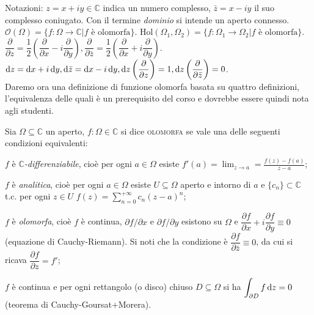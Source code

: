 Notazioni: $z=x+iy \in \mathbb{C}$ indica un numero complesso, $\bar{z}=x-iy$ il suo complesso coniugato. Con il termine \textit{dominio} si intende un aperto connesso. $\mathcal{O}(\Omega)=\{f: \Omega \longrightarrow \mathbb{C} | f \text{ è olomorfa} \}$.
$\text{Hol}(\Omega_1, \Omega_2)=\{f: \Omega_1 \longrightarrow \Omega_2 | f \text{ è olomorfa} \}$.
$\dfrac{\partial}{\partial z}=\dfrac{1}{2}\left(\dfrac{\partial}{\partial x}-i\dfrac{\partial}{\partial y}\right), \dfrac{\partial}{\partial \bar{z}}=\dfrac{1}{2}\left(\dfrac{\partial}{\partial x}+i\dfrac{\partial}{\partial y}\right)$. \\
$\diff z=\diff x+i\diff y, \diff\bar{z}=\diff x-i\diff y, \diff z\left(\dfrac{\partial}{\partial z}\right)=1, \diff z\left(\dfrac{\partial}{\partial \bar{z}}\right)=0$. \\

Daremo ora una definizione di funzione olomorfa basata su quattro definizioni, l'equivalenza delle quali è un prerequisito del corso e dovrebbe essere quindi nota agli studenti.

\begin{defn}
  Sia $\Omega \subseteq \mathbb{C}$ un aperto, $f: \Omega \in \mathbb{C}$ si dice \textsc{olomorfa} se vale una delle seguenti condizioni equivalenti:
  \begin{nlist}
      \item $f$ è \textit{$\mathbb{C}$-differenziabile}, cioè per ogni $a \in \Omega$ esiste $\displaystyle f'(a)=\lim_{z \longrightarrow a}=\frac{f(z)-f(a)}{z-a}$;
      \item $f$ è \textit{analitica}, cioè per ogni $a \in \Omega$ esiste $U \subseteq \Omega$ aperto e intorno di $a$ e $\{c_n\}\subset \mathbb{C}$ t.c. per ogni $z \in U$ $\displaystyle f(z)=\sum_{n=0}^{+\infty} c_n(z-a)^n$;
      \item $f$ è \textit{olomorfa}, cioè $f$ è continua, $\partial f/\partial x$ e $\partial f/\partial y$ esistono su $\Omega$ e $\dfrac{\partial f}{\partial x}+i\dfrac{\partial f}{\partial y} \equiv 0$ (equazione di Cauchy-Riemann).
      Si noti che la condizione è $\dfrac{\partial f}{\partial \bar{z}} \equiv 0$, da cui si ricava $\dfrac{\partial f}{\partial z}=f'$;
      \item $f$ è continua e per ogni rettangolo (o disco) chiuso $D \subseteq \Omega$ si ha $\displaystyle \int_{\partial D} f\mathop{}\!\mathrm{d} z=0$ (teorema di Cauchy-Goursat+Morera).
  \end{nlist}
\end{defn}

